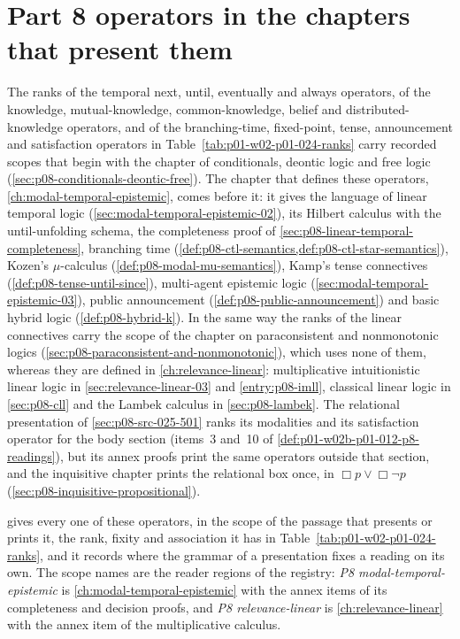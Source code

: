 \section{Part 8 operators in the chapters that present them}
\label{sec:p01-w02c-p01-017-p8-chapters}

The ranks of the temporal next, until, eventually and always operators,
of the knowledge, mutual-knowledge, common-knowledge, belief and
distributed-knowledge operators, and of the branching-time,
fixed-point, tense, announcement and satisfaction operators in
Table~\ref{tab:p01-w02-p01-024-ranks} carry recorded scopes that begin
with the chapter of conditionals, deontic logic and free logic
(\cref{sec:p08-conditionals-deontic-free}).  The chapter that defines
these operators, \cref{ch:modal-temporal-epistemic}, comes before it: it
gives the language of linear temporal logic
(\cref{sec:modal-temporal-epistemic-02}), its Hilbert calculus with the
until-unfolding schema, the completeness proof of
\cref{sec:p08-linear-temporal-completeness}, branching time
(\cref{def:p08-ctl-semantics,def:p08-ctl-star-semantics}), Kozen's
\(\mu\)-calculus (\cref{def:p08-modal-mu-semantics}), Kamp's tense
connectives (\cref{def:p08-tense-until-since}), multi-agent epistemic
logic (\cref{sec:modal-temporal-epistemic-03}), public announcement
(\cref{def:p08-public-announcement}) and basic hybrid logic
(\cref{def:p08-hybrid-k}).  In the same way the ranks of the linear
connectives carry the scope of the chapter on paraconsistent and
nonmonotonic logics (\cref{sec:p08-paraconsistent-and-nonmonotonic}),
which uses none of them, whereas they are defined in
\cref{ch:relevance-linear}: multiplicative intuitionistic linear logic
in \cref{sec:relevance-linear-03} and \cref{entry:p08-imll}, classical
linear logic in \cref{sec:p08-cll} and the Lambek calculus in
\cref{sec:p08-lambek}.  The relational presentation of
\cref{sec:p08-src-025-501} ranks its modalities and its satisfaction
operator for the body section (items~3 and~10 of
\cref{def:p01-w02b-p01-012-p8-readings}), but its annex proofs print the
same operators outside that section, and the inquisitive chapter prints
the relational box once, in \(\Box p\lor\Box\neg p\)
(\cref{sec:p08-inquisitive-propositional}).

 gives every one of these
operators, in the scope of the passage that presents or prints it, the
rank, fixity and association it has in
Table~\ref{tab:p01-w02-p01-024-ranks}, and it records where the grammar
of a presentation fixes a reading on its own.  The scope names are the
reader regions of the registry: \emph{P8 modal-temporal-epistemic} is
\cref{ch:modal-temporal-epistemic} with the annex items of its
completeness and decision proofs, and \emph{P8 relevance-linear} is
\cref{ch:relevance-linear} with the annex item of the multiplicative
calculus.

